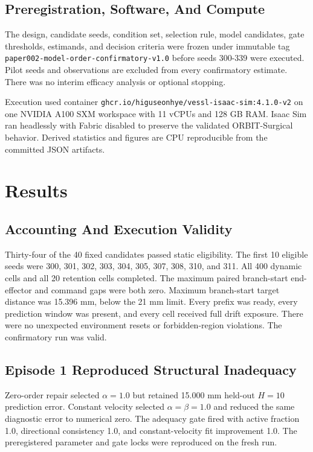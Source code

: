 \documentclass[10pt]{article}
\begin{document}
\subsection{Preregistration, Software, And Compute}

The design, candidate seeds, condition set, selection rule, model candidates, gate thresholds, estimands, and decision criteria were frozen under immutable tag \nolinkurl{paper002-model-order-confirmatory-v1.0} before seeds 300-339 were executed. Pilot seeds and observations are excluded from every confirmatory estimate. There was no interim efficacy analysis or optional stopping.

Execution used container \nolinkurl{ghcr.io/higuseonhye/vessl-isaac-sim:4.1.0-v2} on one NVIDIA A100 SXM workspace with 11 vCPUs and 128 GB RAM. Isaac Sim ran headlessly with Fabric disabled to preserve the validated ORBIT-Surgical behavior. Derived statistics and figures are CPU reproducible from the committed JSON artifacts.

\section{Results}

\subsection{Accounting And Execution Validity}

Thirty-four of the 40 fixed candidates passed static eligibility. The first 10 eligible seeds were 300, 301, 302, 303, 304, 305, 307, 308, 310, and 311. All 400 dynamic cells and all 20 retention cells completed. The maximum paired branch-start end-effector and command gaps were both zero. Maximum branch-start target distance was 15.396 mm, below the 21 mm limit. Every prefix was ready, every prediction window was present, and every cell received full drift exposure. There were no unexpected environment resets or forbidden-region violations. The confirmatory run was valid.

\subsection{Episode 1 Reproduced Structural Inadequacy}

Zero-order repair selected \(\alpha=1.0\) but retained 15.000 mm held-out \(H=10\) prediction error. Constant velocity selected \(\alpha=\beta=1.0\) and reduced the same diagnostic error to numerical zero. The adequacy gate fired with active fraction 1.0, directional consistency 1.0, and constant-velocity fit improvement 1.0. The preregistered parameter and gate locks were reproduced on the fresh run.
\end{document}
